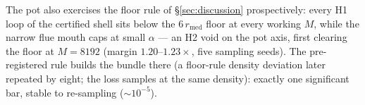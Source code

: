 The pot also exercises the floor rule of \S\ref{sec:discussion}
prospectively: every H1 loop of the certified shell sits below the
$6\,r_{\mathrm{med}}$ floor at every working $M$, while the narrow flue
mouth caps at small $\alpha$ --- an H2 void on the pot axis, first
clearing the floor at $M{=}8192$ (margin $1.20$--$1.23\times$, five
sampling seeds). The pre-registered rule builds the bundle there (a
floor-rule density deviation later repeated by eight; the loss samples
at the same density): exactly one significant bar, stable to
re-sampling (${\sim}10^{-5}$).

